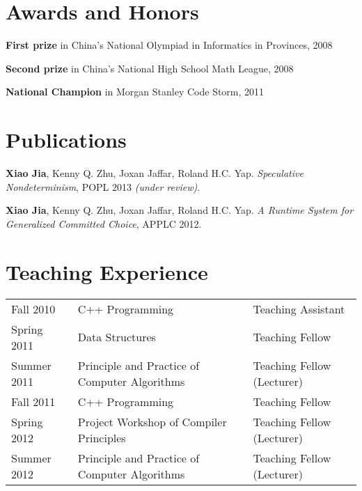 \documentclass[letterpaper]{article}
\renewenvironment{itemize}{
  \begin{list}{}{
    \setlength{\leftmargin}{1.5em}
    \vspace{-1mm}
  }
}{
  \end{list}
}
\begin{document}
\vspace{-7mm}
\section*{Awards and Honors}

\begin{itemize}
  \item \textbf{First prize} in China's National Olympiad in Informatics in Provinces, 2008
  \item \textbf{Second prize} in China's National High School Math League, 2008
  \item \textbf{National Champion} in Morgan Stanley Code Storm, 2011
\end{itemize}


\vspace{-7mm}
\section*{Publications}

\begin{itemize}
  \item \textbf{Xiao Jia}, Kenny Q. Zhu, Joxan Jaffar, Roland H.C. Yap. \emph{Speculative Nondeterminism}, POPL 2013 \emph{(under review)}.
  \item \textbf{Xiao Jia}, Kenny Q. Zhu, Joxan Jaffar, Roland H.C. Yap. \emph{A Runtime System for Generalized Committed Choice}, APPLC 2012.
\end{itemize}


\vspace{-7mm}
\section*{Teaching Experience}

\vspace{-1mm}
\begin{tabular}{lll}
  Fall 2010   & C++ Programming & Teaching Assistant \\
  Spring 2011 & Data Structures & Teaching Fellow \\
  Summer 2011 & Principle and Practice of Computer Algorithms & Teaching Fellow (Lecturer) \\
  Fall 2011   & C++ Programming & Teaching Fellow \\
  Spring 2012 & Project Workshop of Compiler Principles & Teaching Fellow (Lecturer) \\
  Summer 2012 & Principle and Practice of Computer Algorithms & Teaching Fellow (Lecturer)
\end{tabular}
\end{document}
